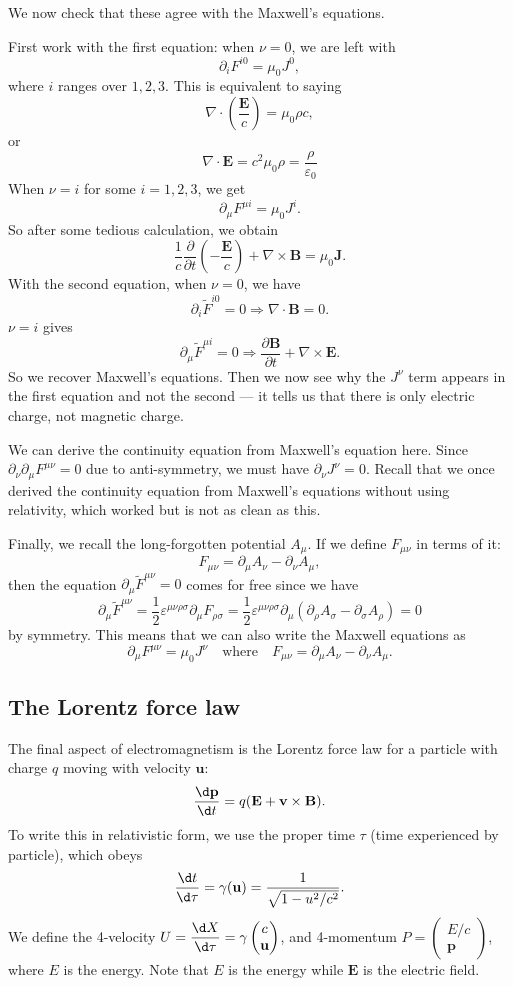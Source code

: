 \documentclass[a4paper]{article}
\begin{document}
We now check that these agree with the Maxwell's equations.

First work with the first equation: when $\nu = 0$, we are left with
\[
  \partial_i F^{i0} = \mu_0 J^0,
\]
where $i$ ranges over $1, 2, 3$. This is equivalent to saying
\[
  \nabla\cdot \left(\frac{\mathbf{E}}{c}\right) = \mu_0 \rho c,
\]
or
\[
  \nabla\cdot \mathbf{E} = c^2 \mu_0 \rho = \frac{\rho}{\varepsilon_0}
\]
When $\nu = i$ for some $i = 1, 2, 3$, we get
\[
  \partial _\mu F^{\mu i} = \mu_0 J^i.
\]
So after some tedious calculation, we obtain
\[
  \frac{1}{c}\frac{\partial}{\partial t}\left(-\frac{\mathbf{E}}{c}\right) + \nabla\times \mathbf{B} = \mu_0 \mathbf{J}.
\]
With the second equation, when $\nu = 0$, we have
\[
  \partial_i \tilde{F}^{i0} = 0 \Rightarrow  \nabla\cdot \mathbf{B} = 0.
\]
$\nu = i$ gives
\[
  \partial_\mu \tilde{F}^{\mu i} = 0 \Rightarrow  \frac{\partial \mathbf{B}}{\partial t} + \nabla\times \mathbf{E}.
\]
So we recover Maxwell's equations. Then we now see why the $J^\nu$ term appears in the first equation and not the second --- it tells us that there is only electric charge, not magnetic charge.

We can derive the continuity equation from Maxwell's equation here. Since $\partial_\nu\partial_\mu F^{\mu\nu} = 0$ due to anti-symmetry, we must have $\partial_\nu J^\nu = 0$. Recall that we once derived the continuity equation from Maxwell's equations without using relativity, which worked but is not as clean as this.

Finally, we recall the long-forgotten potential $A_\mu$. If we define $F_{\mu\nu}$ in terms of it:
\[
  F_{\mu\nu} = \partial_\mu A_\nu - \partial_\nu A_\mu,
\]
then the equation $\partial_\mu \tilde{F}^{\mu\nu} = 0$ comes for free since we have
\[
  \partial_\mu \tilde{F}^{\mu\nu} = \frac{1}{2}\varepsilon^{\mu\nu\rho\sigma}\partial_{\mu}F_{\rho\sigma} = \frac{1}{2} \varepsilon^{\mu\nu\rho\sigma}\partial_\mu(\partial_\rho A_\sigma - \partial_\sigma A_\rho) = 0
\]
by symmetry. This means that we can also write the Maxwell equations as
\[
  \partial_\mu F^{\mu\nu} = \mu_0 J^\nu\quad\text{where}\quad F_{\mu\nu} = \partial_\mu A_\nu - \partial_\nu A_\mu.
\]
\subsection{The Lorentz force law}
The final aspect of electromagnetism is the Lorentz force law for a particle with charge $q$ moving with velocity $\mathbf{u}$:
\[
  \frac{\d \mathbf{p}}{\d t} = q(\mathbf{E} + \mathbf{v}\times \mathbf{B}).
\]
To write this in relativistic form, we use the proper time $\tau$ (time experienced by particle), which obeys
\[
  \frac{\d t}{\d \tau} = \gamma(\mathbf{u}) = \frac{1}{\sqrt{1 - u^2/c^2}}.
\]
We define the 4-velocity $\displaystyle U = \frac{\d X}{\d \tau} = \gamma\begin{pmatrix}c\\ \mathbf{u}\end{pmatrix}$, and 4-momentum $P = \begin{pmatrix}E/c\\ \mathbf{p}\end{pmatrix}$, where $E$ is the energy. Note that $E$ is the energy while $\mathbf{E}$ is the electric field.
\end{document}
